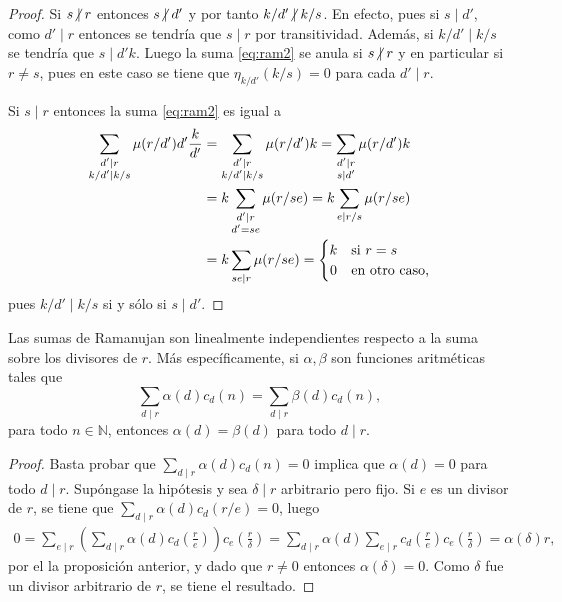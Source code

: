 \begin{proof}
Si $s \centernot\mid r$ entonces $s \centernot\mid d'$ y por tanto $k/d' \centernot\mid k/s$. En efecto, pues si $s \mid d'$, como $d' \mid r$ entonces se tendría que $s \mid r$ por transitividad. Además, si $k/d' \mid k/s$ se tendría que $s \mid d'k$. Luego la suma \eqref{eq:ram2} se anula si $s \centernot\mid r$ y en particular si $r \ne s$, pues en este caso se tiene que $\eta_{k/d'}(k/s)=0$ para cada $d' \mid r$. 
\bigskip

Si $s \mid r$ entonces la suma \eqref{eq:ram2} es igual a
\begin{equation*}
\begin{split}
    \sum_{\substack{d' \mid r \\ k/d' \mid k/s}} \mu(r/d') d' \frac{k}{d'} &= \sum_{\substack{d' \mid r \\ k/d' \mid k/s}} \mu(r/d') k = \sum_{\substack{d' \mid r \\ s \mid d'}} \mu(r/d') k \\
    &= k \sum_{\substack{d' \mid r \\ d'=se}} \mu(r/se) = k \sum_{e \mid r/s} \mu(r/se) \\
    &= k \sum_{se \mid r} \mu(r/se) = \begin{cases}
        \hfil k & \text{si } r=s \\
        \hfil 0 & \text{en otro caso,}
    \end{cases}
\end{split}
\end{equation*}
pues $k/d' \mid k/s$ si y sólo si $s \mid d'$.
\end{proof}

\begin{corollary}\label{cor:ind}
Las sumas de Ramanujan son linealmente independientes respecto a la suma sobre los divisores de $r$. Más específicamente, si $\alpha, \beta$ son funciones aritméticas tales que
\begin{equation*}
    \sum_{d \mid r} \alpha(d) c_d(n) = \sum_{d \mid r} \beta(d) c_d(n),
\end{equation*}
para todo $n \in \mathbb{N}$, entonces $\alpha(d)=\beta(d)$ para todo $d \mid r$.
\end{corollary}
\begin{proof}
Basta probar que $\sum_{d \mid r} \alpha(d) c_d(n)=0$ implica que $\alpha(d)=0$ para todo $d \mid r$. Supóngase la hipótesis y sea $\delta \mid r$ arbitrario pero fijo. Si $e$ es un divisor de $r$, se tiene que $\sum_{d \mid r} \alpha(d) c_d(r/e)=0$, luego
\begin{align*}
    0 = \sum_{e \mid r} \left( \sum_{d \mid r} \alpha(d) c_d \left( \frac{r}{e} \right) \right) c_e \left( \frac{r}{\delta} \right)= \sum_{d \mid r} \alpha(d) \sum_{e \mid r} c_d \left( \frac{r}{e} \right) c_e \left( \frac{r}{\delta} \right) = \alpha(\delta) r,
\end{align*}
por el la proposición anterior, y dado que $r \ne 0$ entonces $\alpha(\delta)=0$. Como $\delta$ fue un divisor arbitrario de $r$, se tiene el resultado.
\end{proof}

